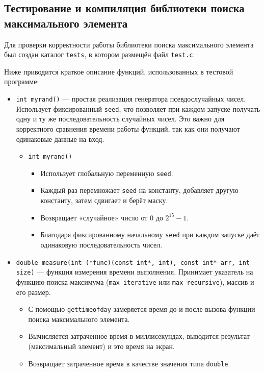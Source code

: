 \subsection{Тестирование и компиляция библиотеки поиска максимального элемента}

Для проверки корректности работы библиотеки поиска максимального элемента был создан каталог \texttt{tests}, в котором размещён файл \texttt{test.c}. 

\vspace{0.5cm}
\noindent
Ниже приводится краткое описание функций, использованных в тестовой программе:

\begin{itemize}
  \item \texttt{int myrand()} — простая реализация генератора псевдослучайных чисел. Использует фиксированный \texttt{seed}, что позволяет при каждом запуске получать одну и ту же последовательность случайных чисел. Это важно для корректного сравнения времени работы функций, так как они получают одинаковые данные на вход.

  \begin{itemize}
    \item \texttt{int myrand()}
    \begin{itemize}
      \item Использует глобальную переменную \texttt{seed}.
      \item Каждый раз перемножает \texttt{seed} на константу, добавляет другую константу, затем сдвигает и берёт маску.
      \item Возвращает «случайное» число от 0 до $2^{15}-1$.
      \item Благодаря фиксированному начальному \texttt{seed} при каждом запуске даёт одинаковую последовательность чисел.
    \end{itemize}
  \end{itemize}

\item \texttt{double measure(int (*func)(const int*, int), const int* arr, int size)} — функция измерения времени выполнения. Принимает указатель на функцию поиска максимума (\texttt{max\_iterative} или \texttt{max\_recursive}), массив и его размер. 
\begin{itemize}
    \item С помощью \texttt{gettimeofday} замеряется время до и после вызова функции поиска максимального элемента.
    \item Вычисляется затраченное время в миллисекундах, выводится результат (максимальный элемент) и это время на экран.
    \item Возвращает затраченное время в качестве значения типа \texttt{double}.
\end{itemize}


\end{itemize}
